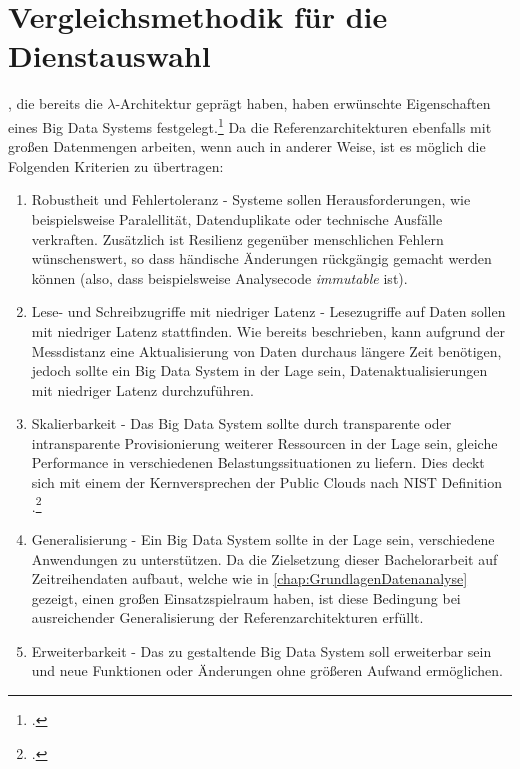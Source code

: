 \section{Vergleichsmethodik für die Dienstauswahl}\label{chap:vergleichsmethodik}

\citeauthor{Marz.2015}, die bereits die $\lambda$-Architektur geprägt haben, haben erwünschte Eigenschaften eines Big Data Systems festgelegt.\footcite[Vgl. auch im Folgenden][7\psqq]{Marz.2015} Da die Referenzarchitekturen ebenfalls mit großen Datenmengen arbeiten, wenn auch in anderer Weise, ist es möglich die Folgenden Kriterien zu übertragen:
\begin{enumerate}
\item Robustheit und Fehlertoleranz  - 
Systeme sollen Herausforderungen, wie beispielsweise Paralellität, Datenduplikate oder technische Ausfälle verkraften. Zusätzlich ist Resilienz gegenüber menschlichen Fehlern wünschenswert, so dass händische Änderungen rückgängig gemacht werden können (also, dass beispielsweise Analysecode \textit{immutable} ist).

\item Lese- und Schreibzugriffe mit niedriger Latenz  - 
Lesezugriffe auf Daten sollen mit niedriger Latenz stattfinden. Wie bereits beschrieben, kann aufgrund der Messdistanz eine Aktualisierung von Daten durchaus längere Zeit benötigen, jedoch sollte ein Big Data System in der Lage sein, Datenaktualisierungen mit niedriger Latenz durchzuführen.

\item Skalierbarkeit  - 
Das Big Data System sollte durch transparente oder intransparente Provisionierung weiterer Ressourcen in der Lage sein, gleiche Performance in verschiedenen Belastungssituationen zu liefern. Dies deckt sich mit einem der Kernversprechen der Public Clouds nach NIST Definition .\footcite[Vgl.][2]{Mell.2011}

\item Generalisierung  - 
Ein Big Data System sollte in der Lage sein, verschiedene Anwendungen zu unterstützen. Da die Zielsetzung dieser Bachelorarbeit auf Zeitreihendaten aufbaut, welche wie in \autoref{chap:GrundlagenDatenanalyse} gezeigt, einen großen Einsatzspielraum haben, ist diese Bedingung bei ausreichender Generalisierung der Referenzarchitekturen erfüllt.

\item Erweiterbarkeit  - 
Das zu gestaltende Big Data System soll erweiterbar sein und neue Funktionen oder Änderungen ohne größeren Aufwand ermöglichen.


\end{enumerate}
